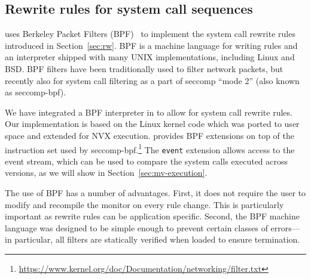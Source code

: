 \subsection{Rewrite rules for system call sequences}
\label{sec:patternmatching}

\varan uses Berkeley Packet Filters (BPF)~\cite{bpf} to implement the system call
rewrite rules introduced in Section~\ref{sec:rw}.  BPF is a machine
language for writing rules and an interpreter shipped with many UNIX
implementations, including Linux and BSD.  BPF filters have been
traditionally used to filter network packets, but recently also for
system call filtering as a part of seccomp ``mode 2'' (also known as
seccomp-bpf).

We have integrated a BPF interpreter in \varan to allow for system
call rewrite rules. Our implementation is based on the Linux kernel
code which was ported to user space and extended for NVX
execution. \varan provides BPF extensions on top of the instruction
set used by seccomp-bpf.\footnote{\url{https://www.kernel.org/doc/Documentation/networking/filter.txt}}
The \lstinline[language={[bpf]Assembler}]`event` extension allows
access to the event stream, which can be used to compare the system
calls executed across versions, as we will show in
Section~\ref{sec:mv-execution}.




The use of BPF has a number of advantages.  First, it does not require
the user to modify and recompile the monitor on every rule
change. This is particularly important as rewrite rules can be
application specific. Second, the BPF machine language was designed to
be simple enough to prevent certain classes of errors---in particular,
all filters are statically verified when loaded to ensure termination.



